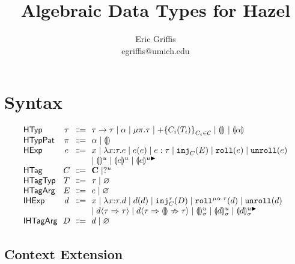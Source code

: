 \documentclass{article}
\title{Algebraic Data Types for Hazel}
\author{Eric Griffis \\ egriffis@umich.edu}
\date{}
\let\originalleft\left
\let\originalright\right
\renewcommand{\left}{\mathopen{}\mathclose\bgroup\originalleft}
\renewcommand{\right}{\aftergroup\egroup\originalright}
\newcommand\Sort[1]{\mathsf{#1}}
\newcommand\IHExp{\Sort{IHExp}}
\newcommand\IHTagArg{\Sort{IHTagArg}}
\newcommand\HExp{\Sort{HExp}}
\newcommand\HTag{\Sort{HTag}}
\newcommand\HTagArg{\Sort{HTagArg}}
\newcommand\HTagTyp{\Sort{HTagTyp}}
\newcommand\HTagVar{\Sort{HTagVar}}
\newcommand\HTyp{\Sort{HTyp}}
\newcommand\HTypPat{\Sort{HTypPat}}
\newcommand\hole[2][]{\llparenthesis#1\rrparenthesis^{#2}}
\newcommand\mhole[2][]{\llparenthesis#1\rrparenthesis^{#2 \blacktriangleright}}
\newcommand\dhole[3][]{\llparenthesis#1\rrparenthesis_{#2}^{#3}}
\newcommand\dmhole[3][]{\llparenthesis#1\rrparenthesis_{#2}^{#3 \blacktriangleright}}
\newcommand\Tarr[2]{#1 \rightarrow #2}
\newcommand\Trec[2]{\mu{#1}.{#2}}
\newcommand\Tsum[1]{+\mathopen{}\left\{#1\right\}}
\newcommand\Tag{\mathbf{C}}
\newcommand\TagHole[1]{?^{#1}}
\newcommand\TagSet{\mathcal{C}}
\newcommand\None{\varnothing}
\newcommand\literal[1]{\mathtt{#1}}
\newcommand\asc[2]{{#1}:{#2}}
\newcommand\Efun[3]{\lambda{#1}{:}{#2}.{#3}}
\newcommand\Eapp[2]{{#1}\left({#2}\right)}
\newcommand\Einj[2]{\literal{inj}_{#1}\left({#2}\right)}
\newcommand\Ecase[2]{\literal{case} \left({#1}\right) \left\{{#2}\right\}}
\newcommand\Eroll[1]{\literal{roll}\left(#1\right)}
\newcommand\Eunroll[1]{\literal{unroll}\left(#1\right)}
\newcommand\Dfun[3]{\lambda{#1}{:}{#2}.{#3}}
\newcommand\Dapp[2]{{#1}\left({#2}\right)}
\newcommand\Dinj[3]{\literal{inj}_{#1}^{#2}\left({#3}\right)}
\newcommand\Dcase[2]{\literal{case} \left({#1}\right) \left\{{#2}\right\}}
\newcommand\Droll[3]{\literal{roll}^{\Trec{#1}{#2}}\left({#3}\right)}
\newcommand\Dunroll[1]{\literal{unroll}\left(#1\right)}
\newcommand\cast[3]{{#1}\langle{#2}\Rightarrow{#3}\rangle}
\newcommand\failedcast[3]{{#1}\langle{#2}\Rightarrow{\llparenthesis\rrparenthesis}\nRightarrow{#3}\rangle}
\begin{document}
\maketitle


\section{Syntax}

\[
  \arraycolsep=0pt
  \begin{array}{l@{~~}c@{~~}c@{~~}l}
    \HTyp & \tau & \Coloneqq &
      \Tarr{\tau}{\tau}
      \mid \alpha
      \mid \Trec{\pi}{\tau}
      \mid \Tsum{C_i(T_i)}_{C_i \in \TagSet}
      \mid \hole{}
      \mid \hole[\alpha]{}
      \\
    \HTypPat & \pi & \Coloneqq & \alpha \mid \hole{} \\
    \HExp & e & \Coloneqq &
      x
      \mid \Efun{x}{\tau}{e}
      \mid \Eapp{e}{e}
      \mid \asc{e}{\tau}
      \mid \Einj{C}{E}
      \mid \Eroll{e}
      \mid \Eunroll{e}
      \\ & & &
      \mid \hole{u}
      \mid \hole[e]{u}
      \mid \mhole[e]{u}
      \\
    \HTag & C & \Coloneqq &
      \Tag
      \mid \TagHole{u}
      \\
    \HTagTyp & T & \Coloneqq & \tau \mid \None \\
    \HTagArg & E & \Coloneqq & e \mid \None \\
    \IHExp & d & \Coloneqq &
      x
      \mid \Dfun{x}{\tau}{d}
      \mid \Dapp{d}{d}
      \mid \Dinj{C}{\tau}{D}
      \mid \Droll{\alpha}{\tau}{d}
      \mid \Dunroll{d}
      \\ & & &
      \mid \cast{d}{\tau}{\tau}
      \mid \failedcast{d}{\tau}{\tau}
      \mid \dhole{\sigma}{u}
      \mid \dhole[d]{\sigma}{u}
      \mid \dmhole[d]{\sigma}{u}
      \\
    \IHTagArg & D & \Coloneqq &
      d
      \mid \None
      \\
  \end{array}
\]


\subsection{Context Extension}
\end{document}
